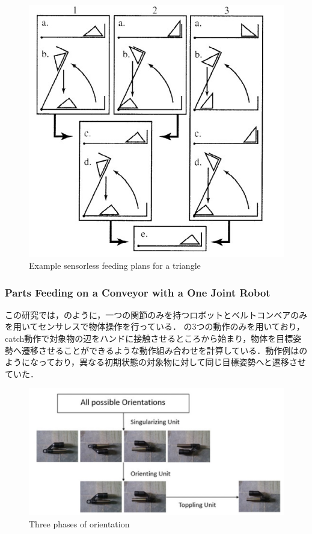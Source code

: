 \documentclass[a4paper,twoside,12pt,papersize, dvipdfmx]{iirthesis}
\begin{document}
\begin{figure}[b]
\begin{minipage}{0.5\hsize}
\includegraphics[width=0.9\hsize]{fig/Introduction/Akella/sensorless_result.jpg}
\caption{Example sensorless feeding plans for a triangle \cite{akella2000}}
\label{fig::sensres}
\end{minipage}
\end{figure}
\subsubsection{Parts Feeding on a Conveyor with a One Joint Robot \cite{akella2000}}
この研究では，のように，一つの関節のみを持つロボットとベルトコンベアのみを用いてセンサレスで物体操作を行っている．
の3つの動作のみを用いており，catch動作で対象物の辺をハンドに接触させるところから始まり，物体を目標姿勢へ遷移させることができるような動作組み合わせを計算している．動作例はのようになっており，異なる初期状態の対象物に対して同じ目標姿勢へと遷移させていた．


\begin{figure}[b]
\centering
\includegraphics[width=0.6\hsize]{fig/Introduction/Udhayakumar/threephase.jpg}
\caption{Three phases of orientation \cite{Udhayakumar}}
\label{fig::three}
\end{figure}
\end{document}
